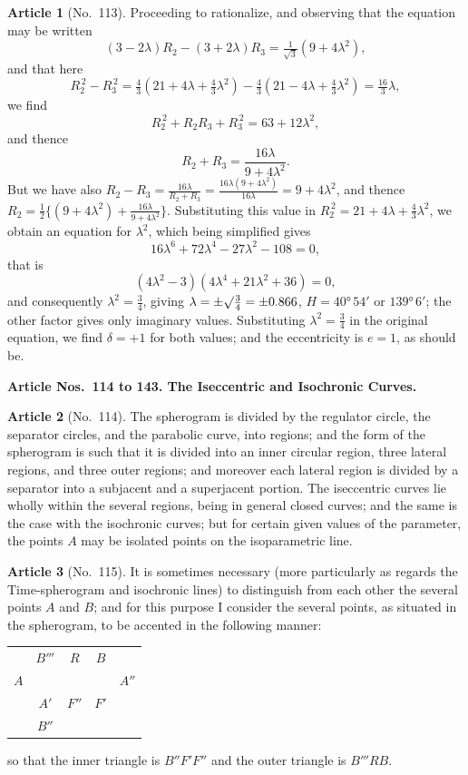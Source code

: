 \documentclass[11pt,a4paper]{article}
\theoremstyle{definition}
\newtheorem{art}{Article}
\begin{document}
\begin{art}[No.~113]
Proceeding to rationalize, and observing that the equation may be written
\[
(3 - 2\lambda)R_2 - (3 + 2\lambda)R_3 = \tfrac{1}{\surd 3}(9 + 4\lambda^2),
\]
and that here
\[
R_2^{\,2} - R_3^{\,2} = \tfrac{4}{3}(21 + 4\lambda + \tfrac{4}{3}\lambda^2) - \tfrac{4}{3}(21 - 4\lambda + \tfrac{4}{3}\lambda^2) = \tfrac{16}{3}\lambda,
\]
we find
\[
R_2^{\,2} + R_2R_3 + R_3^{\,2} = 63 + 12\lambda^2,
\]
and thence
\[
R_2 + R_3 = \frac{16\lambda}{9 + 4\lambda^2}.
\]
But we have also $R_2 - R_3 = \frac{16\lambda}{R_2 + R_3} = \frac{16\lambda(9 + 4\lambda^2)}{16\lambda} = 9 + 4\lambda^2$, and thence $R_2 = \frac{1}{2}\{(9 + 4\lambda^2) + \frac{16\lambda}{9 + 4\lambda^2}\}$. Substituting this value in $R_2^{\,2} = 21 + 4\lambda + \tfrac{4}{3}\lambda^2$, we obtain an equation for $\lambda^2$, which being simplified gives
\[
16\lambda^6 + 72\lambda^4 - 27\lambda^2 - 108 = 0,
\]
that is
\[
(4\lambda^2 - 3)(4\lambda^4 + 21\lambda^2 + 36) = 0,
\]
and consequently $\lambda^2 = \frac{3}{4}$, giving $\lambda = \pm\surd\frac{3}{4} = \pm 0.866$, $H = 40°\, 54'$ or $139°\, 6'$; the other factor gives only imaginary values. Substituting $\lambda^2 = \frac{3}{4}$ in the original equation, we find $\delta = +1$ for both values; and the eccentricity is $e = 1$, as should be.
\end{art}

\newpage
\noindent\textbf{Article Nos.~114 to 143. The Iseccentric and Isochronic Curves.}

\begin{art}[No.~114]
The spherogram is divided by the regulator circle, the separator circles, and the parabolic curve, into regions; and the form of the spherogram is such that it is divided into an inner circular region, three lateral regions, and three outer regions; and moreover each lateral region is divided by a separator into a subjacent and a superjacent portion. The iseccentric curves lie wholly within the several regions, being in general closed curves; and the same is the case with the isochronic curves; but for certain given values of the parameter, the points $A$ may be isolated points on the isoparametric line.
\end{art}

\begin{art}[No.~115]
It is sometimes necessary (more particularly as regards the Time-spherogram and isochronic lines) to distinguish from each other the several points $A$ and $B$; and for this purpose I consider the several points, as situated in the spherogram, to be accented in the following manner:
\begin{center}
\begin{tabular}{ccccc}
 & $B'''$ & $R$ & $B$ & \\
$A$ & & & & $A''$ \\
 & $A'$ & $F''$ & $F'$ & \\
 & $B''$ & & & \\
\end{tabular}
\end{center}
so that the inner triangle is $B''F'F''$ and the outer triangle is $B'''RB$.
\end{art}
\end{document}

